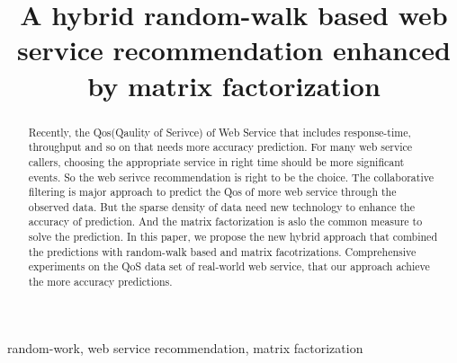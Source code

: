 \documentclass[conference]{IEEEtran}
\begin{document}
\title{A hybrid random-walk based web service recommendation enhanced by matrix factorization}

\author{
  \and
}

\maketitle

\begin{abstract}
Recently, the Qos(Qaulity of Serivce) of Web Service that includes response-time, throughput and so on that needs more accuracy prediction. For many web service  callers, choosing the appropriate service in right time should be more significant events. So the web serivce recommendation is right to be the choice. The collaborative filtering is major approach to predict the Qos of more web service through the observed data. But the sparse density of data need new technology to enhance the accuracy of prediction. And the matrix factorization is aslo the common measure to solve the prediction. In this paper, we propose the new hybrid approach that combined the predictions with random-walk based and matrix facotrizations. Comprehensive experiments on the QoS data set of real-world web service, that our approach achieve the more accuracy predictions.
\end{abstract}

\begin{IEEEkeywords}
  random-work, web service recommendation, matrix factorization
\end{IEEEkeywords}

\IEEEpeerreviewmaketitle

\end{document}
